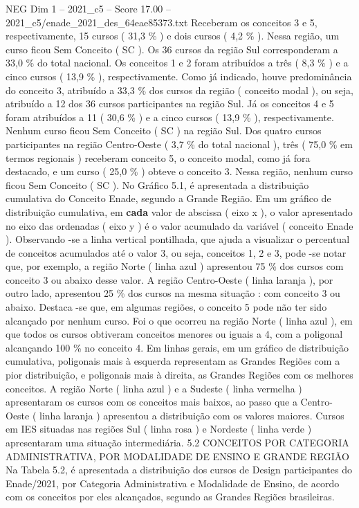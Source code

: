 \begin{textsample}{NEG Dim 1 – 2021\_c5 – Score 17.00 – 2021\_c5/enade\_2021\_des\_64eae85373.txt}
Receberam os conceitos 3 e 5, respectivamente, 15 cursos ( 31,3 \% ) e dois cursos ( 4,2 \% ).
Nessa região, um curso ficou Sem Conceito ( SC ).
Os 36 cursos da região Sul corresponderam a 33,0 \% do total nacional.
Os conceitos 1 e 2 foram atribuídos a três ( 8,3 \% ) e a cinco cursos ( 13,9 \% ), respectivamente.
Como já indicado, houve predominância do conceito 3, atribuído a 33,3 \% dos cursos da região ( conceito modal ), ou seja, atribuído a 12 dos 36 cursos participantes na região Sul.
Já os conceitos 4 e 5 foram atribuídos a 11 ( 30,6 \% ) e a cinco cursos ( 13,9 \% ), respectivamente.
Nenhum curso ficou Sem Conceito ( SC ) na região Sul.
Dos quatro cursos participantes na região Centro-Oeste ( 3,7 \% do total nacional ), três ( 75,0 \% em termos regionais ) receberam conceito 5, o conceito modal, como já fora destacado, e um curso ( 25,0 \% ) obteve o conceito 3.
Nessa região, nenhum curso ficou Sem Conceito ( SC ).
No Gráfico 5.1, é apresentada a distribuição cumulativa do Conceito Enade, segundo a Grande Região.
Em um gráfico de distribuição cumulativa, em \textbf{cada} valor de abscissa ( eixo x ), o valor apresentado no eixo das ordenadas ( eixo y ) é o valor acumulado da variável ( conceito Enade ).
Observando -se a linha vertical pontilhada, que ajuda a visualizar o percentual de conceitos acumulados até o valor 3, ou seja, conceitos 1, 2 e 3, pode -se notar que, por exemplo, a região Norte ( linha azul ) apresentou 75 \% dos cursos com conceito 3 ou abaixo desse valor.
A região Centro-Oeste ( linha laranja ), por outro lado, apresentou 25 \% dos cursos na mesma situação : com conceito 3 ou abaixo.
Destaca -se que, em algumas regiões, o conceito 5 pode não ter sido alcançado por nenhum curso.
Foi o que ocorreu na região Norte ( linha azul ), em que todos os cursos obtiveram conceitos menores ou iguais a 4, com a poligonal alcançando 100 \% no conceito 4.
Em linhas gerais, em um gráfico de distribuição cumulativa, poligonais mais à esquerda representam as Grandes Regiões com a pior distribuição, e poligonais mais à direita, as Grandes Regiões com os melhores conceitos.
A região Norte ( linha azul ) e a Sudeste ( linha vermelha ) apresentaram os cursos com os conceitos mais baixos, ao passo que a Centro-Oeste ( linha laranja ) apresentou a distribuição com os valores maiores.
Cursos em IES situadas nas regiões Sul ( linha rosa ) e Nordeste ( linha verde ) apresentaram uma situação intermediária. 5.2 CONCEITOS POR CATEGORIA ADMINISTRATIVA, POR MODALIDADE DE ENSINO E GRANDE REGIÃO Na Tabela 5.2, é apresentada a distribuição dos cursos de Design participantes do Enade/2021, por Categoria Administrativa e Modalidade de Ensino, de acordo com os conceitos por eles alcançados, segundo as Grandes Regiões brasileiras.

\end{textsample}
